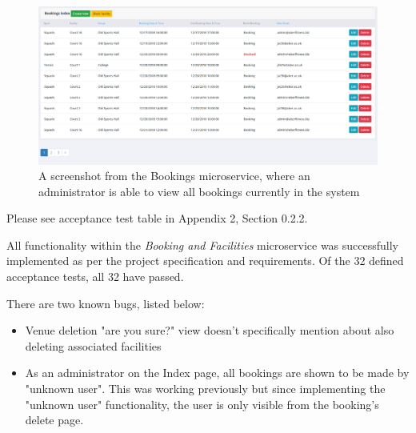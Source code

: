 \begin{figure}[H]
    \centering
    \includegraphics[width=\textwidth]{Images/service_bookings.png}
    \caption{A screenshot from the Bookings microservice, where an administrator is able to view all bookings currently in the system}
\end{figure}

Please see acceptance test table in Appendix 2, Section 0.2.2.

All functionality within the \textit{Booking and Facilities} microservice was successfully implemented as per the project specification and requirements. Of the 32 defined acceptance tests, all 32 have passed.

There are two known bugs, listed below:

\begin{itemize}
	\item Venue deletion "are you sure?" view doesn't specifically mention about also deleting associated facilities

	\item As an administrator on the Index page, all bookings are shown to be made by "unknown user". This was working previously but since implementing the "unknown user" functionality, the user is only visible from the booking's delete page.
\end{itemize}